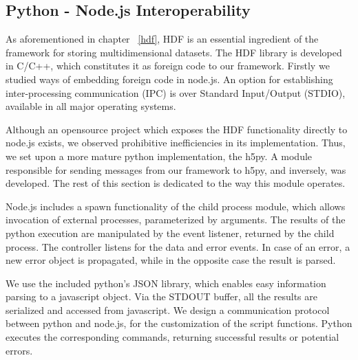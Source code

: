 \subsection{Python - Node.js Interoperability}
As aforementioned in chapter ~\ref{hdf}, HDF is an essential ingredient of the framework for storing multidimensional datasets. The HDF library is developed in C/C++, which constitutes it as foreign code to our framework. Firstly we studied ways of embedding foreign code in node.js. An option for establishing inter-processing communication (IPC) is over Standard Input/Output (STDIO), available in all major operating systems.\par 
	Although an opensource project which exposes the HDF functionality directly to node.js exists, we observed prohibitive inefficiencies in its implementation. Thus, we set upon a more mature python implementation, the h5py. A module responsible for sending messages from our framework to h5py, and inversely, was developed. The rest of this section is dedicated to the way this module operates.\par 
	Node.js includes a spawn functionality of the child process module, which allows invocation of external processes, parameterized by arguments. The results of the python execution are manipulated by the event listener, returned by the child process. The controller listens for the data and error events. In case of an error, a new error object is propagated, while in the opposite case the result is parsed. \par 
	We use the included python's JSON library, which enables easy information parsing to a javascript object. Via the STDOUT buffer, all the results are serialized and accessed from javascript. We design a communication protocol between python and node.js, for the customization of the script functions. Python executes the corresponding commands, returning successful results or potential errors.


